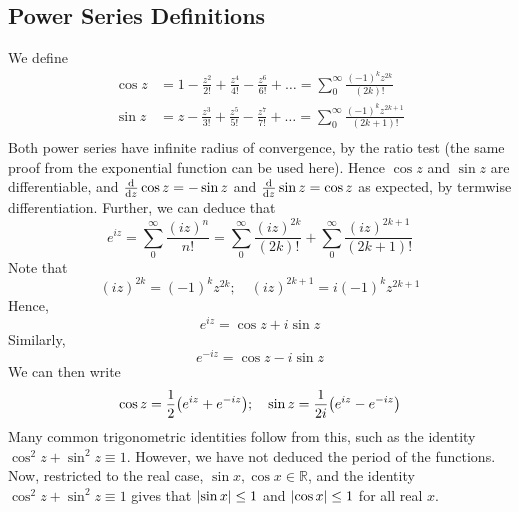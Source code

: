 \subsection{Power Series Definitions}
We define
\begin{align*}
	\cos z & = 1 - \frac{z^2}{2!} + \frac{z^4}{4!} - \frac{z^6}{6!} + \dots = \sum_0^\infty \frac{(-1)^k z^{2k}}{(2k)!}     \\
	\sin z & = z - \frac{z^3}{3!} + \frac{z^5}{5!} - \frac{z^7}{7!} + \dots = \sum_0^\infty \frac{(-1)^k z^{2k+1}}{(2k+1)!} \\
\end{align*}
Both power series have infinite radius of convergence, by the ratio test (the same proof from the exponential function can be used here).
Hence \(\cos z\) and \(\sin z\) are differentiable, and \(\dv{z}\cos z = -\sin z\) and \(\dv{z}\sin z = \cos z\) as expected, by termwise differentiation.
Further, we can deduce that
\[
	e^{iz} = \sum_0^\infty \frac{(iz)^n}{n!} = \sum_0^\infty \frac{(iz)^{2k}}{(2k)!} + \sum_0^\infty \frac{(iz)^{2k+1}}{(2k+1)!}
\]
Note that
\[
	(iz)^{2k} = (-1)^k z^{2k};\quad (iz)^{2k+1} = i (-1)^k z^{2k+1}
\]
Hence,
\[
	e^{iz} = \cos z + i \sin z
\]
Similarly,
\[
	e^{-iz} = \cos z - i \sin z
\]
We can then write
\[
	\cos z = \frac{1}{2}\qty( e^{iz} + e^{-iz} );\quad \sin z = \frac{1}{2i}\qty( e^{iz} - e^{-iz} )
\]
Many common trigonometric identities follow from this, such as the identity \(\cos^2 z + \sin^2 z \equiv 1\).
However, we have not deduced the period of the functions.
Now, restricted to the real case, \(\sin x, \cos x \in \mathbb R\), and the identity \(\cos^2 z + \sin^2 z \equiv 1\) gives that \(\abs{\sin x} \leq 1\) and \(\abs{\cos x} \leq 1\) for all real \(x\).

